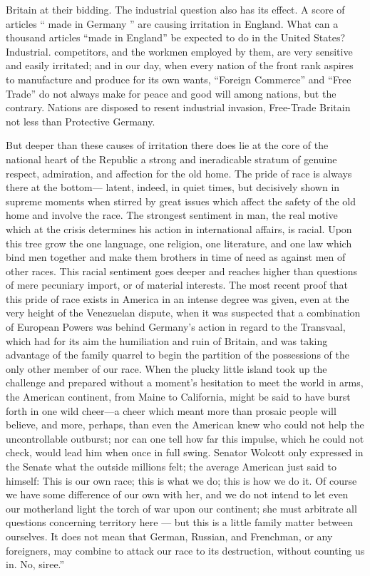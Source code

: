 \documentclass[11pt,openany]{book}
\begin{document}
Britain at their bidding. The industrial question also has its effect. A score of articles `` made in Germany '' are causing irritation in England. What can a thousand articles ``made in England'' be expected to do in the United States? Industrial. competitors, and the workmen employed by them, are very sensitive and easily irritated; and in our day, when every nation of the front rank aspires to manufacture and produce for its own wants, ``Foreign Commerce'' and ``Free Trade'' do not always make for peace and good will among nations, but the contrary. Nations are disposed to resent industrial invasion, Free-Trade Britain not less than Protective Germany.

But deeper than these causes of irritation there does lie at the core of the national heart of the Republic a strong and ineradicable stratum of genuine respect, admiration, and affection for the old home. The pride of race is always there at the bottom--- latent, indeed, in quiet times, but decisively shown in supreme moments when stirred by great issues which affect the safety of the old home and involve the race. The strongest sentiment in man, the real motive which at the crisis determines his action in international affairs, is racial. Upon this tree grow the one language, one religion, one literature, and one law which bind men together and make them brothers in time of need as against men of other races. This racial sentiment goes deeper and reaches higher than questions of mere pecuniary import, or of material interests. The most recent proof that this pride of race exists in America in an intense degree was given, even at the very height of the Venezuelan dispute, when it was suspected that a combination of European Powers was behind Germany's action in regard to the Transvaal, which had for its aim the humiliation and ruin of Britain, and was taking advantage of the family quarrel to begin the partition of the possessions of the only other member of our race. When the plucky little island took up the challenge and prepared without a moment's hesitation to meet the world in arms, the American continent, from Maine to California, might be said to have burst forth in one wild cheer---a cheer which meant more than prosaic people will believe, and more, perhaps, than even the American knew who could not help the uncontrollable outburst; nor can one tell how far this impulse, which he could not check, would lead him when once in full swing. Senator Wolcott only expressed in the Senate what the outside millions felt; the average American just said to himself: This is our own race; this is what we do; this is how we do it. Of course we have some difference of our own with her, and we do not intend to let even our motherland light the torch of war upon our continent; she must arbitrate all questions concerning territory here --- but this is a little family matter between ourselves. It does not mean that German, Russian, and Frenchman, or any foreigners, may combine to attack our race to its destruction, without counting us in. No, siree.''
\end{document}
